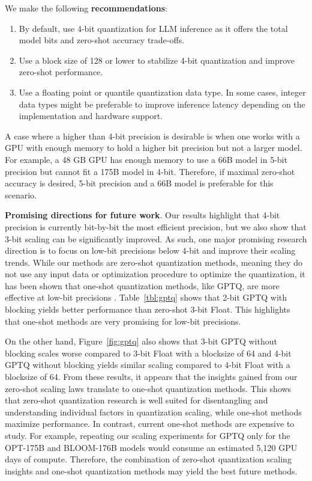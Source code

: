 We make the following {\bf recommendations}:

\begin{enumerate}
\itemsep=0em
    \item By default, use 4-bit quantization for LLM inference as it offers the total model bits and zero-shot accuracy trade-offs.
    \item Use a block size of 128 or lower to stabilize 4-bit quantization and improve zero-shot performance.
    \item Use a floating point or quantile quantization data type. In some cases, integer data types might be preferable to improve inference latency depending on the implementation and hardware support.
\end{enumerate}

A case where a higher than 4-bit precision is desirable is when one works with a GPU with enough memory to hold a higher bit precision but not a larger model. For example, a 48 GB GPU has enough memory to use a 66B model in 5-bit precision but cannot fit a 175B model in 4-bit. Therefore, if maximal zero-shot accuracy is desired, 5-bit precision and a 66B model is preferable for this scenario.

{\bf Promising directions for future work}. Our results highlight that 4-bit precision is currently bit-by-bit the most efficient precision, but we also show that 3-bit scaling can be significantly improved. As such, one major promising research direction is to focus on low-bit precisions below 4-bit and improve their scaling trends. While our methods are zero-shot quantization methods, meaning they do not use any input data or optimization procedure to optimize the quantization, it has been shown that one-shot quantization methods, like GPTQ, are more effective at low-bit precisions \citep{frantar2022gptq}. Table~\ref{tbl:gptq} shows that 2-bit GPTQ with blocking yields better performance than zero-shot 3-bit Float. This highlights that one-shot methods are very promising for low-bit precisions. 

On the other hand, Figure~\ref{fig:gptq} also shows that 3-bit GPTQ without blocking scales worse compared to 3-bit Float with a blocksize of 64 and 4-bit GPTQ without blocking yields similar scaling compared to 4-bit Float with a blocksize of 64. From these results, it appears that the insights gained from our zero-shot scaling laws translate to one-shot quantization methods. This shows that zero-shot quantization research is well suited for disentangling and understanding individual factors in quantization scaling, while one-shot methods maximize performance. In contrast, current one-shot methods are expensive to study. For example, repeating our scaling experiments for GPTQ only for the OPT-175B and BLOOM-176B models would consume an estimated 5,120 GPU days of compute. Therefore, the combination of zero-shot quantization scaling insights and one-shot quantization methods may yield the best future methods.

